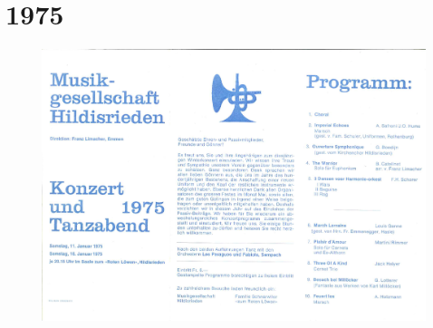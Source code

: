 \documentclass{book}
\begin{document}
\pagebreak
\section{1975}
\begin{figure}[p]
    \includegraphics[scale=0.7]{./chap/1975/1975.pdf}
\end{figure}

\end{document}
